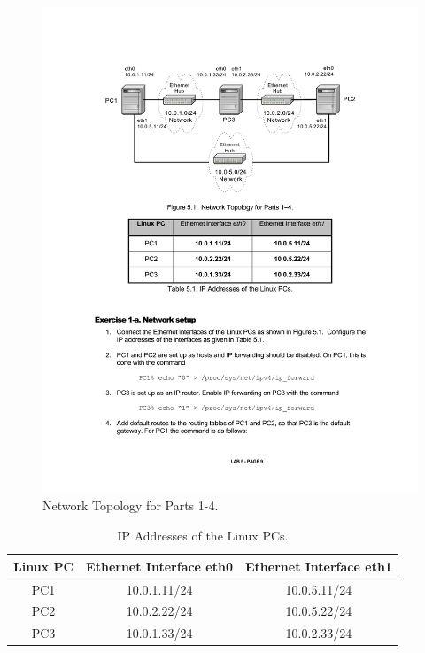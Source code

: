 \begin{figure}[ht]
	\includegraphics{graphics/fig-5-1.pdf}	
	\caption{Network Topology for Parts 1-4.}
	\label{fig:lab5-network-topology1}
\end{figure}

\begin{table}[ht]
	\centering
	\begin{tabular}{| c | c | c |}	
		\hline
		\textbf{Linux PC} & \textbf{Ethernet Interface eth0} & \textbf{Ethernet Interface eth1}  \\ \hline
		PC1 & 10.0.1.11/24 & 10.0.5.11/24 \\ 
		PC2 & 10.0.2.22/24 & 10.0.5.22/24 \\
		PC3 & 10.0.1.33/24 & 10.0.2.33/24 \\ \hline
	\end{tabular}
	\caption{IP Addresses of the Linux PCs.}
	\label{tab:lab5-ip-addresses}
\end{table}


